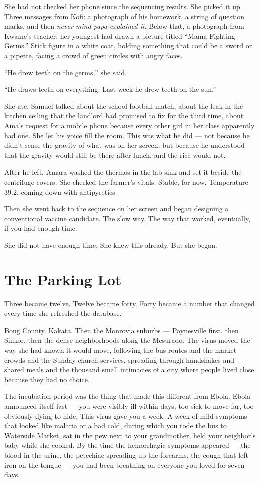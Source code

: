 \documentclass[11pt]{article}
\begin{document}
She had not checked her phone since the sequencing results. She picked it up. Three messages from Kofi: a photograph of his homework, a string of question marks, and then \emph{never mind papa explained it}. Below that, a photograph from Kwame's teacher: her youngest had drawn a picture titled ``Mama Fighting Germs.'' Stick figure in a white coat, holding something that could be a sword or a pipette, facing a crowd of green circles with angry faces.

``He drew teeth on the germs,'' she said.

``He draws teeth on everything. Last week he drew teeth on the sun.''

She ate. Samuel talked about the school football match, about the leak in the kitchen ceiling that the landlord had promised to fix for the third time, about Ama's request for a mobile phone because every other girl in her class apparently had one. She let his voice fill the room. This was what he did --- not because he didn't sense the gravity of what was on her screen, but because he understood that the gravity would still be there after lunch, and the rice would not.

After he left, Amara washed the thermos in the lab sink and set it beside the centrifuge covers. She checked the farmer's vitals. Stable, for now. Temperature 39.2, coming down with antipyretics.

Then she went back to the sequence on her screen and began designing a conventional vaccine candidate. The slow way. The way that worked, eventually, if you had enough time.

She did not have enough time. She knew this already. But she began.

\section*{The Parking Lot}

Three became twelve. Twelve became forty. Forty became a number that changed every time she refreshed the database.

Bong County. Kakata. Then the Monrovia suburbs --- Paynesville first, then Sinkor, then the dense neighborhoods along the Mesurado. The virus moved the way she had known it would move, following the bus routes and the market crowds and the Sunday church services, spreading through handshakes and shared meals and the thousand small intimacies of a city where people lived close because they had no choice.

The incubation period was the thing that made this different from Ebola. Ebola announced itself fast --- you were visibly ill within days, too sick to move far, too obviously dying to hide. This virus gave you a week. A week of mild symptoms that looked like malaria or a bad cold, during which you rode the bus to Waterside Market, sat in the pew next to your grandmother, held your neighbor's baby while she cooked. By the time the hemorrhagic symptoms appeared --- the blood in the urine, the petechiae spreading up the forearms, the cough that left iron on the tongue --- you had been breathing on everyone you loved for seven days.
\end{document}
